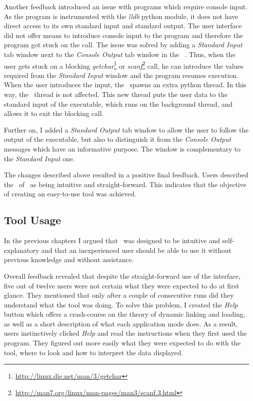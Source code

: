Another feedback introduced an issue with programs which require console input. As the program is instrumented with the \textit{lldb} python module, it does not have direct access to its own standard input and standard output. The user interface did not offer means to introduce console input to the program and therefore the program got stuck on the call. The issue was solved by adding a \textit{Standard Input} tab window next to the \textit{Console Output} tab window in the \gui\ . Thus, when the user gets stuck on a blocking \textit{getchar}\footnote{\url{http://linux.die.net/man/3/getchar}} or \textit{scanf}\footnote{\url{http://man7.org/linux/man-pages/man3/scanf.3.html}} call, he can introduce the values required from the \textit{Standard Input} window and the program resumes execution. When the user introduces the input, the \gui\ spawns an extra python thread. In this way, the \gui\ thread is not affected. This new thread puts the user data to the standard input of the executable, which runs on the background thread, and allows it to exit the blocking call.

Further on, I added a \textit{Standard Output} tab window to allow the user to follow the output of the executable, but also to distinguish it from the \textit{Console Output} messages which have an informative purpose. The window is complementary to the \textit{Standard Input} one.

The changes described above resulted in a positive final feedback. Users described the \gui\ of \project\ as being intuitive and straight-forward. This indicates that the objective of creating an easy-to-use tool was achieved.

\subsection{Tool Usage}
\label{sub-sec:tool-usage-feedback}

In the previous chapters I argued that \project\ was designed to be intuitive and self-explanatory and that an inexperienced user should be able to use it without previous knowledge and without assistance.

Overall feedback revealed that despite the straight-forward use of the interface, five out of twelve users were not certain what they were expected to do at first glance. They mentioned that only after a couple of consecutive runs did they understand what the tool was doing. To solve this problem, I created the \textit{Help} button which offers a crash-course on the theory of dynamic linking and loading, as well as a short description of what each application mode does. As a result, users instinctively clicked \textit{Help} and read the instructions when they first used the program. They figured out more easily what they were expected to do with the tool, where to look and how to interpret the data displayed.

